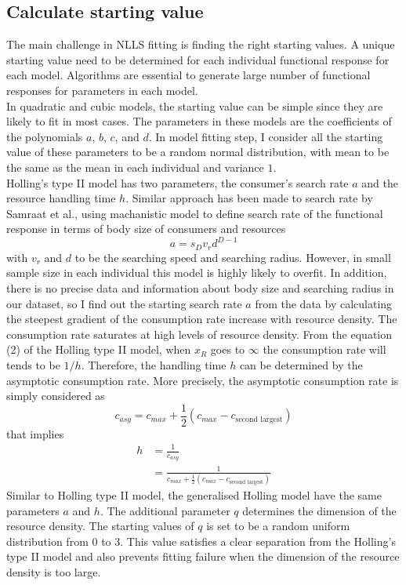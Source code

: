 \documentclass{article}[11pt,a4,twosided,doublespacing,titlepagenumber=on,numbers=endperiod]
\begin{document}
\subsection{Calculate starting value}
The main challenge in NLLS fitting is finding the right starting values. A unique starting value need to be determined for each individual functional response for each model. Algorithms are essential to generate large number of functional responses for parameters in each model.\\
\noindent
In quadratic and cubic models, the starting value can be simple since they are likely to fit in most cases. The parameters in these models are the coefficients of the polynomials $a$, $b$, $c$, and $d$. In model fitting step, I consider all the starting value of these parameters to be a random normal distribution, with mean to be the same as the mean in each individual and variance $1$.\\
\noindent
Holling's type II model has two parameters, the consumer's search rate $a$ and the resource handling time $h$. Similar approach has been made to search rate by Samraat et al.\cite{pawar2012dimensionality}, using machanistic model to define search rate of the functional response in terms of body size of consumers and resources
\begin{equation}
    a = s_D v_r d^{D-1}
\end{equation}
with $v_r$ and $d$ to be the searching speed and searching radius. However, in small sample size in each individual this model is highly likely to overfit. In addition, there is no precise data and information about body size and searching radius in our dataset, so I find out the starting search rate $a$ from the data by calculating the steepest gradient of the consumption rate increase with resource density. The consumption rate saturates at high levels of resource density. From the equation (2) of the Holling type II model, when $x_R$ goes to $\infty$ the consumption rate will tends to be $1/h$. Therefore, the handling time $h$ can be determined by the asymptotic consumption rate. More precisely, the asymptotic consumption rate is simply considered as
\begin{equation}
    c_{asy} = c_{max} + \frac{1}{2} (c_{max} - c_{\text{second largest}})
\end{equation}
that implies
\begin{align*}
    h &= \frac{1}{c_{asy}}\\
      &= \frac{1}{c_{max} + \frac{1}{2} (c_{max} - c_{\text{second largest}})}
\end{align*}
Similar to Holling type II model, the generalised Holling model have the same parameters $a$ and $h$. The additional parameter $q$ determines the dimension of the resource density. The starting values of $q$ is set to be a random uniform distribution from 0 to 3. This value satisfies a clear separation from the Holling's type II model and also prevents fitting failure when the dimension of the resource density is too large.
\end{document}
